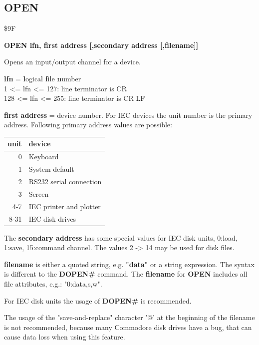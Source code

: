 
\newpage
\subsection{OPEN}
\begin{description}[leftmargin=2cm,style=nextline]
\item [Token:] \$9F
\item [Format:]
  {\bf OPEN lfn, first address [,secondary address [,filename]]}
\item [Usage:]
   Opens an input/output channel for
   a device.

   {\bf lfn} = {\bf l}ogical {\bf f}ile {\bf n}umber \\
   1 <= lfn <= 127: line terminator is CR \\
   128 <= lfn <= 255: line terminator is CR LF

   {\bf first address} = device number.
   For IEC devices the unit number is the primary address.
   Following primary address values are possible:

{\setlength{\tabcolsep}{1mm}
\ttfamily
\begin{tabular}{|r|l|}
\hline
  unit  & device \\
\hline
  0 & Keyboard \\
  1 & System default \\
  2 & RS232 serial connection \\
  3 & Screen \\
  4-7 & IEC printer and plotter \\
  8-31 & IEC disk drives \\
\hline
\end{tabular}
}

   The {\bf secondary address} has some special values for
   IEC disk units, 0:load, 1:save, 15:command channel.
   The values 2 -> 14 may be used for disk files.

   {\bf filename} is either a quoted string, e.g. {\bf "data"} or
   a string expression. The syntax is different to the {\bf DOPEN\#}
   command. The {\bf filename} for {\bf OPEN} includes all
   file attributes, e.g.: "0:data,s,w".

\item [Remarks:]
   For IEC disk units the usage of {\bf DOPEN\#} is recommended.

   The usage of the "save-and-replace" character '@' at the
   beginning of the filename is not recommended, because many
   Commodore disk drives have a bug, that can cause data loss
   when using this feature.


\end{description}
